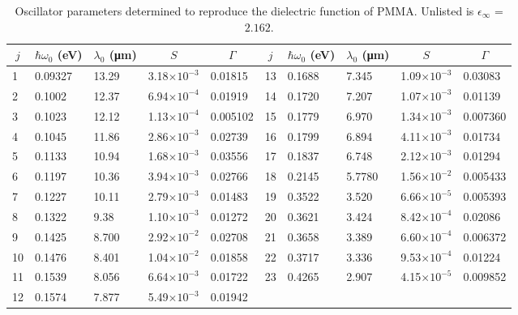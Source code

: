 \begin{table}
	\caption{\label{tab:PMMALorentzModel} Oscillator parameters determined to reproduce the dielectric function of PMMA.\cite{Tsuda2018} Unlisted is $\epsilon_{\infty}$ = $2.162$.}
	\begin{center}
		\renewcommand{\arraystretch}{1.15}
		\setlength{\tabcolsep}{0.10cm}
		\begin{tabular}{llllllllll}
			\hline 
			\hline
			\multicolumn{1}{c}{$j$} &
			\multicolumn{1}{c}{$\hbar \omega_{0}$ (eV)} & \multicolumn{1}{c}{$\lambda_{0}$ (\si{\micro\meter})} &
			\multicolumn{1}{c}{$S$} &
			\multicolumn{1}{c}{$\Gamma$} &
			\multicolumn{1}{c}{$j$} &
			\multicolumn{1}{c}{$\hbar \omega_{0}$ (eV)} & \multicolumn{1}{c}{$\lambda_{0}$ (\si{\micro\meter})} &
			\multicolumn{1}{c}{$S$} &
			\multicolumn{1}{c}{$\Gamma$} \\ 	
			\hline 
			1 & 0.09327 & 13.29 & 3.18$ \times 10^{-3}$ & 0.01815 & 13 & 0.1688 & 7.345 & 1.09$ \times 10^{-3}$ & 0.03083 \\
			2 & 0.1002 & 12.37 & 6.94$ \times 10^{-4}$ & 0.01919 & 14 & 0.1720 & 7.207 & 1.07$ \times 10^{-3}$ & 0.01139 \\
			3 & 0.1023 & 12.12 & 1.13$ \times 10^{-4}$ & 0.005102 & 15 & 0.1779 & 6.970 & 1.34$ \times 10^{-3}$ & 0.007360 \\
			4 & 0.1045 & 11.86 & 2.86$ \times 10^{-3}$ & 0.02739 & 16 & 0.1799 & 6.894 & 4.11$ \times 10^{-3}$ & 0.01734 \\
			5 & 0.1133 & 10.94 & 1.68$ \times 10^{-3}$ & 0.03556 & 17 & 0.1837 & 6.748 & 2.12$ \times 10^{-3}$ & 0.01294 \\
			6 & 0.1197 & 10.36 & 3.94$ \times 10^{-3}$ & 0.02766 & 18 & 0.2145 & 5.7780 & 1.56$ \times 10^{-2}$ & 0.005433 \\
			7 & 0.1227 & 10.11 & 2.79$ \times 10^{-3}$ & 0.01483 & 19 & 0.3522 & 3.520 & 6.66$ \times 10^{-5}$ & 0.005393 \\
			8 & 0.1322 & 9.38 & 1.10$ \times 10^{-3}$ & 0.01272 & 20 & 0.3621 & 3.424 & 8.42$ \times 10^{-4}$ & 0.02086 \\
			9 & 0.1425 & 8.700 & 2.92$ \times 10^{-2}$ & 0.02708 & 21 & 0.3658 & 3.389 & 6.60$ \times 10^{-4}$ & 0.006372 \\
			10 & 0.1476 & 8.401 & 1.04$ \times 10^{-2}$ & 0.01858 & 22 & 0.3717 & 3.336 & 9.53$ \times 10^{-4}$ & 0.01224 \\
			11 & 0.1539 & 8.056 & 6.64$ \times 10^{-3}$ & 0.01722 & 23 & 0.4265 & 2.907 & 4.15$ \times 10^{-5}$ & 0.009852 \\
			12 & 0.1574 & 7.877 & 5.49$ \times 10^{-3}$ & 0.01942 &  &  &  &  &  \\
			\hline
			\hline
		\end{tabular} 
	\end{center}
\end{table}

